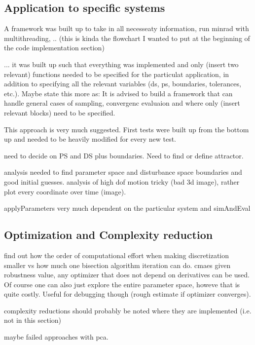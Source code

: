 \subsection{Application to specific systems}
    
    A framework was built up to take in all necesseaty information, run minrad with multithreading, ..
    (this is kinda the flowchart I wanted to put at the beginning of the code implementation section)

    ... it was built up such that everything was implemented and only (insert two relevant) functions needed to be specified for the particulat application, in addition to specifying all the relevant variables (ds, ps, boundaries, tolerances, etc.).
    Maybe state this more as: It is advised to build a framework that can handle general cases of sampling, convergenc evaluaion and where only (insert relevant blocks) need to be specified. 

    This approach is very much suggested. First tests were built up from the bottom up and needed to be heavily modified for every new test. 

    need to decide on PS and DS plus boundaries. Need to find or define attractor. 

    analysis needed to find parameter space and disturbance space boundaries and good initial guesses.
    analysis of high dof motion tricky (bad 3d image), rather plot every coordinate over time (image). 


    applyParameters
        very much dependent on the particular system and 
    simAndEval

\subsection{Optimization and Complexity reduction}
    

    find out how the order of computational effort when making discretization smaller vs how much one bisection algorithm iteration can do. 
    cmaes
    given robustness value, any optimizer that does not depend on derivatives can be used. 
    Of course one can also just explore the entire parameter space, howeve that is quite costly. Useful for debugging though (rough estimate if optimizer converges).

    complexity reductions should probably be noted where they are implemented (i.e. not in this section)

    maybe failed approaches with pca. 

